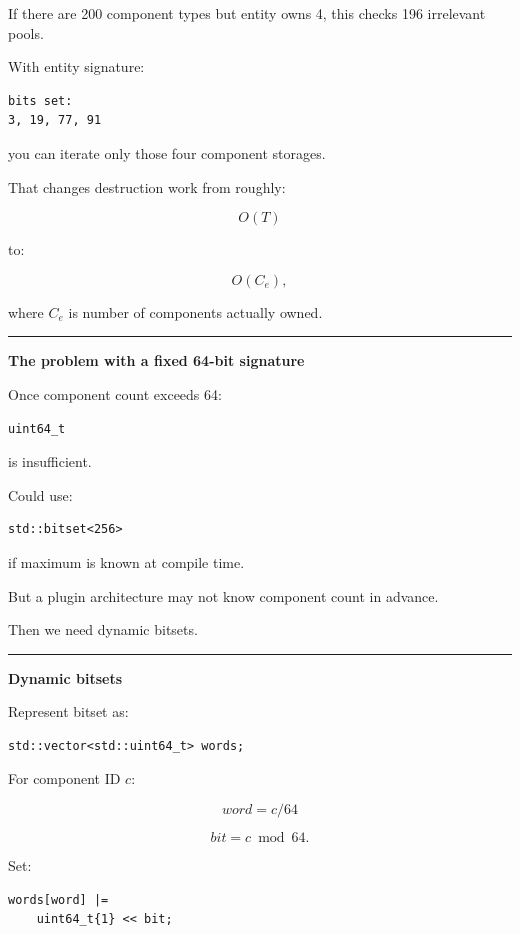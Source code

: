 If there are 200 component types but entity owns 4, this checks 196 irrelevant pools.

With entity signature:

\begin{verbatim}
bits set:
3, 19, 77, 91
\end{verbatim}

you can iterate only those four component storages.

That changes destruction work from roughly:

\[
O(T)
\]

to:

\[
O(C_e),
\]

where \(C_e\) is number of components actually owned.

\begin{center}\rule{0.5\linewidth}{0.5pt}\end{center}

\textbf{The problem with a fixed 64-bit signature}

Once component count exceeds 64:

\begin{verbatim}
uint64_t
\end{verbatim}

is insufficient.

Could use:

\begin{verbatim}
std::bitset<256>
\end{verbatim}

if maximum is known at compile time.

But a plugin architecture may not know component count in advance.

Then we need dynamic bitsets.

\begin{center}\rule{0.5\linewidth}{0.5pt}\end{center}

\textbf{Dynamic bitsets}

Represent bitset as:

\begin{verbatim}
std::vector<std::uint64_t> words;
\end{verbatim}

For component ID \(c\):

\[
word=c/64
\]

\[
bit=c\bmod64.
\]

Set:

\begin{verbatim}
words[word] |=
    uint64_t{1} << bit;
\end{verbatim}

